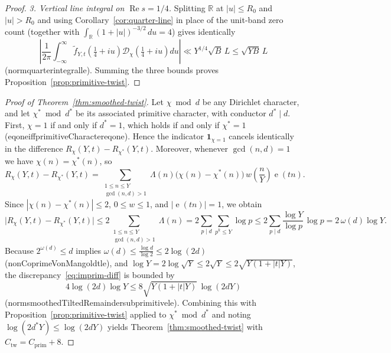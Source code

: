 \documentclass[11pt,reqno]{amsart}
\numberwithin{equation}{section}
\theoremstyle{definition}
\newcommand{\R}{\mathbb{R}}
\newcommand{\1}{\mathbf{1}}
\newcommand{\e}{\operatorname{e}}
\newcommand{\D}{\mathcal{D}}
\renewcommand{\Re}{\operatorname{Re}}
\newcommand{\lean}[1]{{\footnotesize\ttfamily\renewcommand{\_}{\textunderscore\allowbreak}#1}}
\begin{document}
\begin{proof}
\emph{3. Vertical line integral on $\Re s = 1/4$.}
Splitting $\R$ at $|u| \le R_0$ and $|u| > R_0$ and using Corollary~\ref{cor:quarter-line} in place of the unit-band zero count (together with $\int_{\R} (1+|u|)^{-3/2}\,du = 4$) gives identically
\[
  \left|\frac{1}{2\pi}\int_{-\infty}^\infty \widetilde{f}_{Y,t}\!\left(\tfrac{1}{4}+iu\right) \D_\chi\!\left(\tfrac{1}{4}+iu\right) du\right|
  \ll Y^{1/4}\sqrt{B}\, L \le \sqrt{Y B}\, L
\]
(\lean{norm\_quarter\_integral\_le}). Summing the three bounds proves Proposition~\ref{prop:primitive-twist}.
\end{proof}

\begin{proof}[Proof of Theorem~\ref{thm:smoothed-twist}]
Let $\chi \bmod d$ be any Dirichlet character, and let $\chi^* \bmod d^*$ be its associated primitive character, with conductor $d^* \mid d$. First, $\chi = 1$ if and only if $d^* = 1$, which holds if and only if $\chi^* = 1$ (\lean{eq\_one\_iff\_primitiveCharacter\_eq\_one}). Hence the indicator $\1_{\chi=1}$ cancels identically in the difference $R_\chi(Y, t) - R_{\chi^*}(Y, t)$. Moreover, whenever $\gcd(n, d) = 1$ we have $\chi(n) = \chi^*(n)$, so
\[
  R_\chi(Y, t) - R_{\chi^*}(Y, t)
  = \sum_{\substack{1 \le n \le Y \\ \gcd(n, d) > 1}} \Lambda(n)\bigl(\chi(n) - \chi^*(n)\bigr)\, w\!\left(\frac{n}{Y}\right) \e(tn).
\]
Since $|\chi(n) - \chi^*(n)| \le 2$, $0 \le w \le 1$, and $|\e(tn)| = 1$, we obtain
\begin{equation}\label{eq:imprim-diff}
  \bigl|R_\chi(Y, t) - R_{\chi^*}(Y, t)\bigr|
  \le 2 \sum_{\substack{1 \le n \le Y \\ \gcd(n, d) > 1}} \Lambda(n)
  = 2 \sum_{p \mid d} \sum_{p^k \le Y} \log p
  \le 2 \sum_{p \mid d} \frac{\log Y}{\log p}\,\log p
  = 2\,\omega(d)\log Y.
\end{equation}
Because $2^{\omega(d)} \le d$ implies $\omega(d) \le \frac{\log d}{\log 2} \le 2\log(2d)$ (\lean{nonCoprimeVonMangoldt\_le}), and $\log Y = 2\log\sqrt{Y} \le 2\sqrt{Y} \le 2\sqrt{Y(1+|t|Y)}$, the discrepancy~\eqref{eq:imprim-diff} is bounded by
\[
  4\log(2d)\log Y \le 8 \sqrt{Y(1 + |t|Y)}\,\log(2 d Y)
\]
(\lean{norm\_smoothedTiltedRemainder\_sub\_primitive\_le}). Combining this with Proposition~\ref{prop:primitive-twist} applied to $\chi^* \bmod d^*$ and noting $\log(2d^* Y) \le \log(2dY)$ yields Theorem~\ref{thm:smoothed-twist} with $C_{\mathrm{tw}} = C_{\mathrm{prim}} + 8$.
\end{proof}

\end{document}
